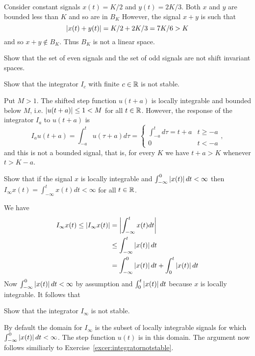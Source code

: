 \begin{excersizelist}
\begin{solution}
Consider constant signals $x(t) = K/2$ and $y(t) = 2K/3$. Both $x$ and $y$ are bounded less than $K$ and so are in $B_K$  However, the signal $x + y$ is such that
\[
\left\vert x(t) + y(t) \right\vert = K/2 + 2K/3 = 7K/6 > K
\]
and so $x + y \notin B_K$.  Thus $B_K$ is not a linear space.
\end{solution} 

\item \label{exer:evenoddnoshiftinvariant} Show that the set of even signals and the set of odd signals are not shift invariant spaces.

\item \label{excer:integratornotstable1} Show that the integrator $I_c$ with finite $c\in{\mathbb R}$ is not stable.
\begin{solution}
Put $M > 1$.  The shifted step function $u(t + a)$ is locally integrable and bounded below $M$, i.e. $\vert u(t+a) \vert \leq 1 < M$ for all $t \in {\mathbb R}$.  However, the response of the integrator $I_a$ to $u(t+a)$ is
\[
I_au(t+a) = \int_{-a}^t u(\tau + a)d\tau = \begin{cases}
\int_{-a}^t d\tau = t + a & t \geq -a \\
0 & t < -a 
\end{cases},
\]
and this is not a bounded signal, that is, for every $K$ we have $t + a > K$ whenever $t > K - a$.
\end{solution}

\item \label{excer:domainintegrator} Show that if the signal $x$ is locally integrable and $\int_{-\infty}^0\left\vert x(t) \right\vert dt < \infty$ then $I_\infty x(t) = \int_{-\infty}^t x(t) dt < \infty$ for all $t \in {\mathbb R}$.
\begin{solution}
We have
\begin{align*}
I_\infty x(t) \leq \left\vert I_\infty x(t) \right\vert &= \left\vert \int_{-\infty}^t x(t)dt  \right\vert \\
&\leq \int_{-\infty}^t \left\vert x(t) \right\vert dt \\
&= \int_{-\infty}^0 \left\vert x(t) \right\vert dt + \int_{0}^t \left\vert x(t) \right\vert dt
\end{align*}
Now $\int_{-\infty}^0 \left\vert x(t) \right\vert dt < \infty$ by assumption and $\int_{0}^t \left\vert x(t) \right\vert dt$ because $x$ is locally integrable.  It follows that 
\end{solution}

\item \label{excer:integratornotstable} Show that the integrator $I_\infty$ is not stable.
\begin{solution}
By default the domain for $I_\infty$ is the subset of locally integrable signals for which $\int_{-\infty}^0\left\vert x(t) \right\vert dt < \infty$.  The step function $u(t)$ is in this domain.  The argument now follows similiarly to Exercise~\ref{excer:integratornotstable}.
\end{solution}


\end{excersizelist}
